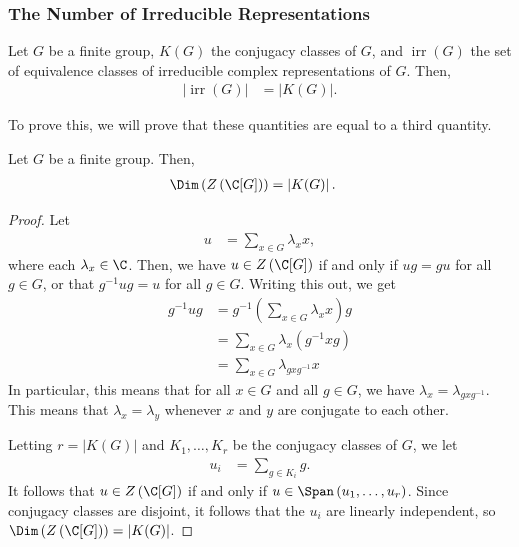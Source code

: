 \documentclass[10pt]{mypackage}
\begin{document}
\subsubsection{The Number of Irreducible Representations}%
\begin{theorem}
  Let $G$ be a finite group, $K(G)$ the conjugacy classes of $G$, and $\operatorname{irr}\left( G \right)$ the set of equivalence classes of irreducible complex representations of $G$. Then,
  \begin{align*}
    \left\vert \operatorname{irr}\left( G \right) \right\vert &= \left\vert K(G) \right\vert.
  \end{align*}
\end{theorem}
To prove this, we will prove that these quantities are equal to a third quantity.
\begin{theorem}
  Let $G$ be a finite group. Then,
  \begin{align*}
    \Dim\left( Z\left( \C[G] \right) \right) &= \left\vert K(G) \right\vert.
  \end{align*}
\end{theorem}
\begin{proof}
  Let
  \begin{align*}
    u &= \sum_{x\in G} \lambda_x x,
  \end{align*}
  where each $\lambda_x\in \C$. Then, we have $u\in Z\left( \C[G] \right)$ if and only if $ug = gu$ for all $g\in G$, or that $g^{-1}ug= u$ for all $g\in G$. Writing this out, we get
  \begin{align*}
    g^{-1}ug &= g^{-1}\left( \sum_{x\in G}\lambda_x x \right)g\\
             &= \sum_{x\in G}\lambda_x \left( g^{-1}xg \right)\\
             &= \sum_{x\in G} \lambda_{gxg^{-1}}x
  \end{align*}
  In particular, this means that for all $x\in G$ and all $g\in G$, we have $\lambda_x = \lambda_{gxg^{-1}}$. This means that $\lambda_x = \lambda_y$ whenever $x$ and $y$ are conjugate to each other.

  Letting $r = \left\vert K(G) \right\vert$ and $K_1,\dots,K_r$ be the conjugacy classes of $G$, we let
  \begin{align*}
    u_i &= \sum_{g\in K_i}g.
  \end{align*}
  It follows that $u\in Z\left( \C[G] \right)$ if and only if $u\in \Span\left( u_1,\dots,u_r \right)$. Since conjugacy classes are disjoint, it follows that the $u_i$ are linearly independent, so $\Dim\left( Z\left( \C[G] \right) \right) = \left\vert K(G) \right\vert$.
\end{proof}
\end{document}
